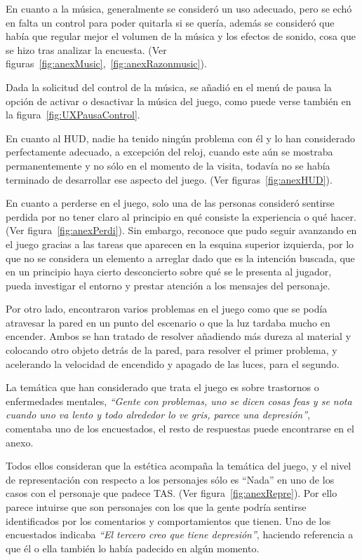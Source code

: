 \documentclass[12pt, a4paper,twoside,titlepage]{book}
\begin{document}
En cuanto a la música, generalmente se consideró un uso adecuado, pero se echó en falta un control para poder quitarla si se quería, además se consideró que había que regular mejor el volumen de la música y los efectos de sonido, cosa que se hizo tras analizar la encuesta. (Ver figuras~\ref{fig:anexMusic},~\ref{fig:anexRazonmusic}). 

Dada la solicitud del control de la música, se añadió en el menú de pausa la opción de activar o desactivar la música del juego, como puede verse también en la figura~\ref{fig:UXPausaControl}.

En cuanto al HUD, nadie ha tenido ningún problema con él y lo han considerado perfectamente adecuado, a excepción del reloj, cuando este aún se mostraba permanentemente y no sólo en el momento de la visita, todavía no se había terminado de desarrollar ese aspecto del juego. (Ver figuras~\ref{fig:anexHUD}). 

En cuanto a perderse en el juego, solo una de las personas consideró sentirse perdida por no tener claro al principio en qué consiste la experiencia o qué hacer. (Ver figura~\ref{fig:anexPerdi}). Sin embargo, reconoce que pudo seguir avanzando en el juego gracias a las tareas que aparecen en la esquina superior izquierda, por lo que no se considera un elemento a arreglar dado que es la intención buscada, que en un principio haya cierto desconcierto sobre qué se le presenta al jugador, pueda investigar el entorno y prestar atención a los mensajes del personaje.

Por otro lado, encontraron varios problemas en el juego como que se podía atravesar la pared en un punto del escenario o que la luz tardaba mucho en encender. Ambos se han tratado de resolver añadiendo más dureza al material y colocando otro objeto detrás de la pared, para resolver el primer problema, y acelerando la velocidad de encendido y apagado de las luces, para el segundo. 

La temática que han considerado que trata el juego es sobre trastornos o enfermedades mentales, \textit{``Gente con problemas, uno se dicen cosas feas y se nota cuando uno va lento y todo alrededor lo ve gris, parece una depresión''}, comentaba uno de los encuestados, el resto de respuestas puede encontrarse en el anexo. 

Todos ellos consideran que la estética acompaña la temática del juego, y el nivel de representación con respecto a los personajes sólo es ``Nada'' en uno de los casos con el personaje que padece TAS. (Ver figura~\ref{fig:anexRepre}). Por ello parece intuirse que son personajes con los que la gente podría sentirse identificados por los comentarios y comportamientos que tienen. Uno de los encuestados indicaba \textit{``El tercero creo que tiene depresión''}, haciendo referencia a que él o ella también lo había padecido en algún momento. 
\end{document}

